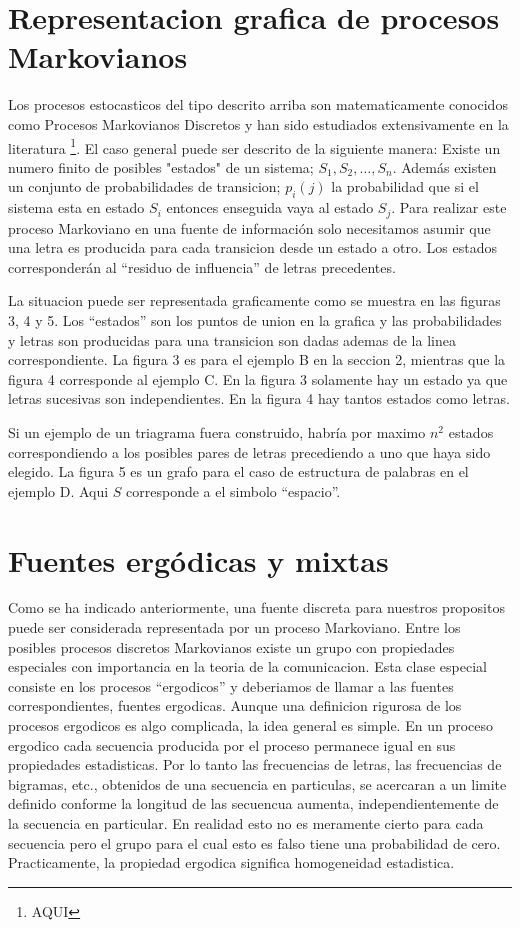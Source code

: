 \section{Representacion grafica de procesos Markovianos}

Los procesos estocasticos del tipo descrito arriba son matematicamente
conocidos como Procesos Markovianos Discretos y han sido estudiados
extensivamente en la literatura \footnote{AQUI}. El caso general puede
ser descrito de la siguiente manera: Existe un numero finito de
posibles "estados" de un sistema; $S_{1}, S_{2}, \ldots,
S_{n}$. Adem\'{a}s existen un conjunto de probabilidades de
transicion; $p_{i}(j)$ la probabilidad que si el sistema esta en
estado $S_{i}$ entonces enseguida vaya al estado $S_{j}$. Para
realizar este proceso Markoviano en una fuente de informaci\'{o}n solo
necesitamos asumir que una letra es producida para cada transicion
desde un estado a otro. Los estados corresponder\'{a}n al ``residuo de
influencia'' de letras precedentes.

La situacion puede ser representada graficamente como se muestra en
las figuras 3, 4 y 5. Los ``estados'' son los puntos de union
en la grafica y las probabilidades y letras son producidas para una
transicion son dadas ademas de la linea correspondiente. La figura 3
es para el ejemplo B en la seccion 2, mientras que la figura 4
corresponde al ejemplo C. En la figura 3
solamente hay un estado ya que letras sucesivas son independientes. En
la figura 4 hay tantos estados como letras. 

Si un ejemplo de un triagrama fuera construido, habr\'{i}a por maximo
$n^{2}$ estados correspondiendo a los posibles pares de letras
precediendo a uno que haya sido elegido. La figura 5 es un grafo para
el caso de estructura de palabras en el ejemplo D. Aqui $S$
corresponde a el simbolo ``espacio''. 

\section{Fuentes erg\'{o}dicas y mixtas}

Como se ha indicado anteriormente, una fuente discreta para nuestros
propositos puede ser considerada representada por un proceso
Markoviano. Entre los posibles procesos discretos Markovianos existe
un grupo con propiedades especiales con importancia en la teoria de la
comunicacion. Esta clase especial consiste en los procesos
``ergodicos'' y deberiamos de llamar a las fuentes correspondientes,
fuentes ergodicas. Aunque una definicion rigurosa de los procesos
ergodicos es algo complicada, la idea general es simple. En un proceso
ergodico cada secuencia producida por el proceso permanece igual en
sus propiedades estadisticas. Por lo tanto las frecuencias de letras,
las frecuencias de bigramas, etc., obtenidos de una secuencia en
particulas, se acercaran a un limite definido conforme la longitud de
las secuencua aumenta, independientemente de la secuencia en
particular. En realidad esto no es meramente cierto para cada
secuencia pero el grupo para el cual esto es falso tiene una
probabilidad de cero. Practicamente, la propiedad ergodica significa
homogeneidad estadistica.

